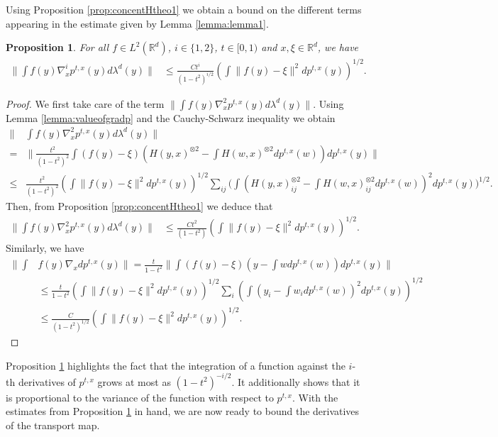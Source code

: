 \documentclass{article}
\newtheorem{proposition}{Proposition}
\begin{document}
Using Proposition \ref{prop:concentHtheo1} we obtain a bound on the different terms appearing in the estimate given by Lemma \ref{lemma:lemma1}.
\begin{proposition}\label{prop:firstboundongradsth1}
    For all $f\in L^2(\mathbb{R}^d)$, $i\in \{1,2\}$, $t\in[ 0,1)$ and $x,\xi\in \mathbb{R}^d$, we have
    \begin{align*}
    \|\int f(y) \nabla_x^i p^{t,x}(y)d\lambda^d(y)\| 
    &\leq \frac{Ct^i}{(1-t^2)^{i/2}}\left(\int \|f(y)-\xi\|^2dp^{t,x}(y)\right)^{1/2}.
\end{align*}
\end{proposition}

\begin{proof}
We first take care of the term $\|\int f(y) \nabla_x^2 p^{t,x}(y)d\lambda^d(y)\|$. Using Lemma \ref{lemma:valueofgradp} and the Cauchy-Schwarz inequality we obtain 
\begin{align*}
    \|& \int f(y)\nabla^2_x p^{t,x}(y)d\lambda^d(y)\| \\
    =&\|  \frac{t^2}{(1-t^2)^2}\int \left(f(y)-\xi\right)\left(H(y,x)^{\otimes 2} - \int H(w,x)^{\otimes 2} dp^{t,x}(w)\right)dp^{t,x}(y)\|\\
    \leq &\frac{t^2}{(1-t^2)^2} \left(\int \|f(y)-\xi\|^2dp^{t,x}(y)\right)^{1/2}\sum_{ij} \Biggl(\int\left(H(y,x)^{\otimes 2}_{ij} - \int H(w,x)^{\otimes 2}_{ij} dp^{t,x}(w)\right)^2dp^{t,x}(y)\Biggl)^{1/2}.
\end{align*}
    Then, from Proposition \ref{prop:concentHtheo1} we deduce that 
\begin{align*}
    \|\int f(y) \nabla_x^2 p^{t,x}(y)d\lambda^d(y)\| 
    &\leq \frac{Ct^2}{(1-t^2)}\left(\int \|f(y)-\xi\|^2dp^{t,x}(y)\right)^{1/2}.
\end{align*}
Similarly, we have
\begin{align*}
    \|\int & f(y) \nabla_x dp^{t,x}(y)\| = \frac{t}{1-t^2}\|\int (f(y)-\xi)\left(y-\int wdp^{t,x}(w)\right) dp^{t,x}(y)\|\\
    &\leq \frac{t}{1-t^2}\left(\int \|f(y)-\xi\|^2dp^{t,x}(y)\right)^{1/2}\sum_i \left( \int\left(y_i-\int w_idp^{t,x}(w)\right)^2 dp^{t,x}(y)\right)^{1/2}
    \\
    &\leq \frac{C}{(1-t^2)^{1/2}}\left(\int \|f(y)-\xi\|^2dp^{t,x}(y)\right)^{1/2}.
\end{align*}
\end{proof}
Proposition \ref{prop:firstboundongradsth1} highlights the fact that the integration of a function against the $i$-th derivatives of $p^{t,x}$ grows at most as $(1-t^2)^{-i/2}$. It additionally shows that it is proportional to the variance of the function with respect to $p^{t,x}$. With the estimates from Proposition \ref{prop:firstboundongradsth1} in hand, we are now ready to bound the derivatives of the transport map.
\end{document}
